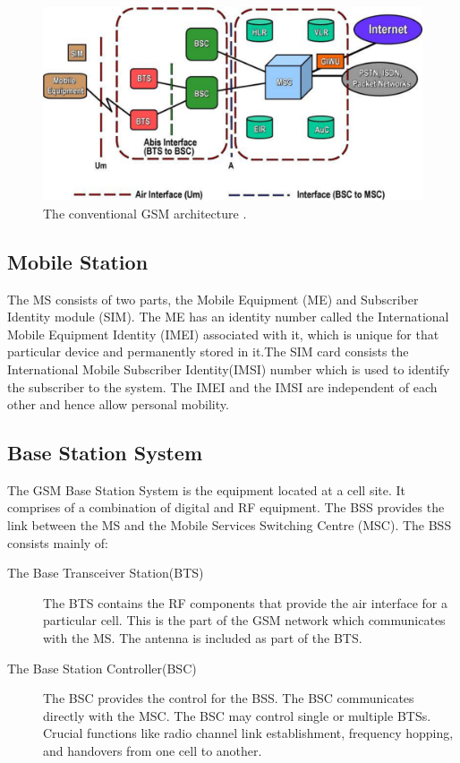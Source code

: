 \begin{figure}[h]
\centering
\includegraphics[width=1\textwidth]{gsmArch}
\caption[The conventional GSM architecture]{The conventional GSM architecture {\cite{wikiHill2dot0}}.}
\label{gsmArch}
\end{figure}

\subsection{Mobile Station}
The MS consists of two parts, the Mobile Equipment (ME) and Subscriber
Identity module (SIM). The ME has an identity number called the International
 Mobile Equipment Identity (IMEI) associated with it, which is unique for
that particular device and permanently stored in it.The SIM card consists
the International Mobile Subscriber Identity(IMSI) number which is used
to identify the subscriber to the system. The IMEI and the IMSI are independent
of each other and hence allow personal mobility.

\subsection{Base Station System}
The GSM Base Station System is the equipment located at a cell site. It
comprises of a combination of digital and RF equipment. The BSS provides
the link between the MS and the Mobile Services Switching Centre (MSC).
The BSS consists mainly of:
\begin{description}
\item[The Base Transceiver Station(BTS)]
The BTS contains the RF components that provide the air interface for
 a particular cell. This is the part of the GSM network which communicates
 with the MS. The antenna is included as part of the BTS.
\item[The Base Station Controller(BSC)]
The BSC provides the control for the BSS. The BSC communicates directly
with the MSC. The BSC may control single or multiple BTSs. Crucial functions
like radio channel link establishment, frequency hopping, and handovers from
one cell to another.

\end{description}

